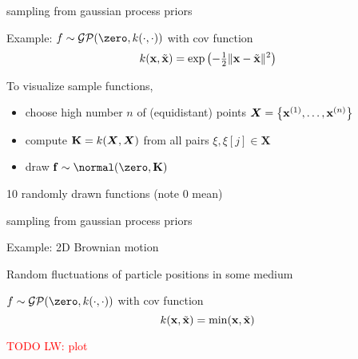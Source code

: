 \documentclass[11pt,compress,t,notes=noshow, xcolor=table]{beamer}
\begin{document}
\begin{framei}[sep=L]{sampling from gaussian process priors}
\item Example: $f \sim \mathcal{GP}(\zero, k(\cdot, \cdot))$ with cov function
$$ k(\mathbf{x}, \tilde{\mathbf{x}}) = \exp\left(-\tfrac{1}{2}\|\mathbf{x} - \tilde{\mathbf{x}}\|^2\right)$$
\item To visualize sample functions, 
\begin{itemize}
\item choose high number $n$ of (equidistant) points $\bm{X} = \left\{ \mathbf{x}^{(1)}, \ldots, \mathbf{x}^{(n)}\right\}$
  \item compute $\mathbf{K} = k(\bm{X}, \bm{X})$ from all pairs $\xi, \xi[j] \in \bm{X}$ 
  \item draw $\fv \sim \normal(\zero, \Kmat)$ 
\end{itemize}
\item 10 randomly drawn functions (note 0 mean)
\vfill
{}
\end{framei}

\begin{framei}[sep=L]{sampling from gaussian process priors}
\item Example: 2D Brownian motion
\item Random fluctuations of particle positions in some medium
\item $f \sim \mathcal{GP}(\zero, k(\cdot, \cdot))$ with cov function
$$ k(\mathbf{x}, \tilde{\mathbf{x}}) = \min (\mathbf{x}, \tilde{\mathbf{x}})$$
\item \textcolor{red}{TODO LW: plot}
\end{framei}

\endlecture
\end{document}
